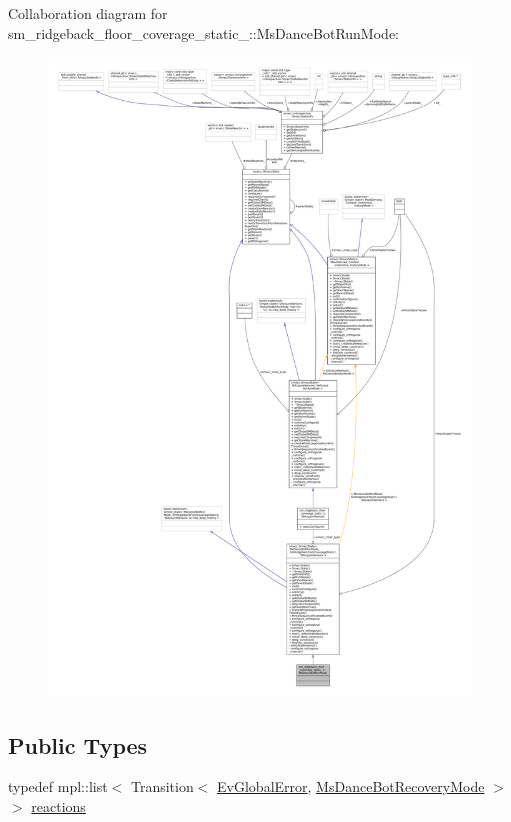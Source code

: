 Collaboration diagram for sm\+\_\+ridgeback\+\_\+floor\+\_\+coverage\+\_\+static\+\_\+:\+:Ms\+Dance\+Bot\+Run\+Mode\+:
\nopagebreak
\begin{figure}[H]
\begin{center}
\leavevmode
\includegraphics[width=350pt]{classsm__ridgeback__floor__coverage__static__1_1_1MsDanceBotRunMode__coll__graph}
\end{center}
\end{figure}
\subsection*{Public Types}
\begin{DoxyCompactItemize}
\item 
typedef mpl\+::list$<$ Transition$<$ \hyperlink{structsm__ridgeback__floor__coverage__static__1_1_1EvGlobalError}{Ev\+Global\+Error}, \hyperlink{classsm__ridgeback__floor__coverage__static__1_1_1MsDanceBotRecoveryMode}{Ms\+Dance\+Bot\+Recovery\+Mode} $>$ $>$ \hyperlink{classsm__ridgeback__floor__coverage__static__1_1_1MsDanceBotRunMode_a135fc80d5d84c8cdca6eec833d3a7e2f}{reactions}
\end{DoxyCompactItemize}
